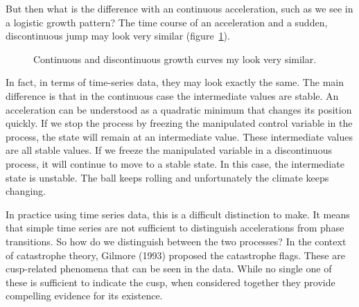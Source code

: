 \documentclass[
  a4paper,
  DIV=11,
  numbers=noendperiod,
  oneside]{scrreprt}
\begin{document}
But then what is the difference with an continuous acceleration, such as
we see in a logistic growth pattern? The time course of an acceleration
and a sudden, discontinuous jump may look very similar
(figure~\ref{fig-ch3-img18-old-30}).

\begin{figure}


\caption{\label{fig-ch3-img18-old-30}Continuous and discontinuous growth
curves my look very similar.}

\end{figure}%

In fact, in terms of time-series data, they may look exactly the same.
The main difference is that in the continuous case the intermediate
values are stable. An acceleration can be understood as a quadratic
minimum that changes its position quickly. If we stop the process by
freezing the manipulated control variable in the process, the state will
remain at an intermediate value. These intermediate values are all
stable values. If we freeze the manipulated variable in a discontinuous
process, it will continue to move to a stable state. In this case, the
intermediate state is unstable. The ball keeps rolling and unfortunately
the climate keeps changing.

In practice using time series data, this is a difficult distinction to
make. It means that simple time series are not sufficient to distinguish
accelerations from phase transitions. So how do we distinguish between
the two processes? In the context of catastrophe theory, Gilmore (1993)
proposed the catastrophe flags. These are cusp-related phenomena that
can be seen in the data. While no single one of these is sufficient to
indicate the cusp, when considered together they provide compelling
evidence for its existence.
\end{document}
